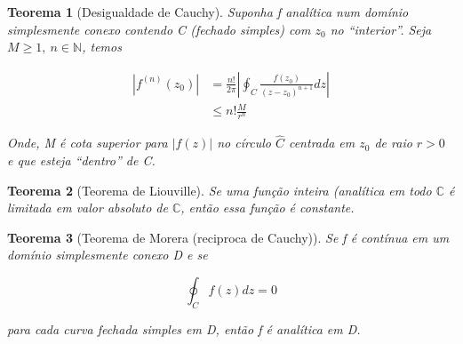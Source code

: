 \documentclass{article}
\newtheorem{theorem}{Teorema}
\begin{document}
\begin{theorem}[Desigualdade de Cauchy]
Suponha f analítica num domínio simplesmente conexo contendo C (fechado simples) com $z_0$ no ``interior''. Seja $M \geq 1,\ n \in \mathbb{N}$, temos

\begin{align*}
    \left| f^{(n)}(z_0) \right| &= \frac{n!}{2 \pi} \left| \oint_C \frac{f(z_0)}{(z - z_0)^{n+1}} d z \right| \\
    &\leq n! \frac{M}{r^n}
\end{align*}

Onde, M é cota superior para $|f(z)|$ no círculo $\hat{C}$ centrada em $z_0$ de raio $r > 0$ e que esteja ``dentro'' de C.
\end{theorem}

\begin{theorem}[Teorema de Liouville]
Se uma função inteira (analítica em todo $\mathbb{C}$ é limitada em valor absoluto de $\mathbb{C}$, então essa função é constante.
\end{theorem}

\begin{theorem}[Teorema de Morera (reciproca de Cauchy)]
Se f é contínua em um domínio simplesmente conexo D e se

$$\oint_C f(z) d z = 0$$

para cada curva fechada simples em D, então f é analítica em D.
\end{theorem}
\end{document}
